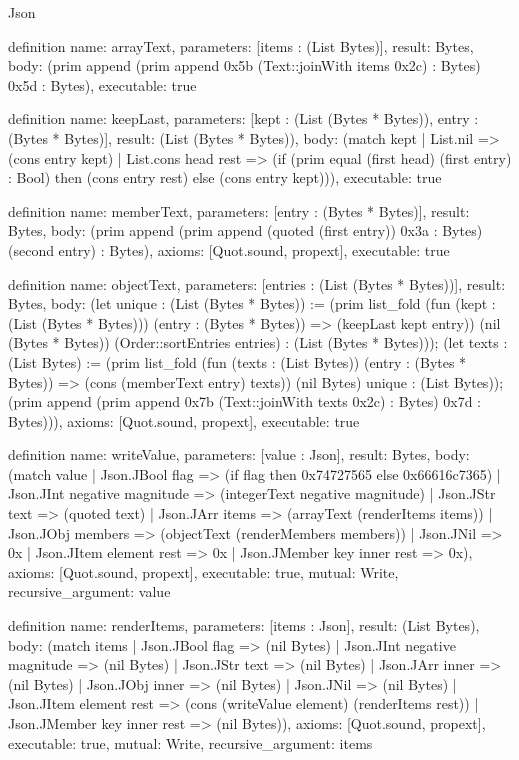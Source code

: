 \begin{lexlean}{Json}
\begin{semanticmodule}
definition{
  name: arrayText,
  parameters: [items : (List Bytes)],
  result: Bytes,
  body: (prim append (prim append 0x5b (Text::joinWith items 0x2c) : Bytes) 0x5d : Bytes),
  executable: true
}

definition{
  name: keepLast,
  parameters: [kept : (List (Bytes * Bytes)), entry : (Bytes * Bytes)],
  result: (List (Bytes * Bytes)),
  body: (match kept
    | List.nil => (cons entry kept)
    | List.cons head rest => (if (prim equal (first head) (first entry) : Bool) then (cons entry rest) else (cons entry kept))),
  executable: true
}

definition{
  name: memberText,
  parameters: [entry : (Bytes * Bytes)],
  result: Bytes,
  body: (prim append (prim append (quoted (first entry)) 0x3a : Bytes) (second entry) : Bytes),
  axioms: [Quot.sound, propext],
  executable: true
}

definition{
  name: objectText,
  parameters: [entries : (List (Bytes * Bytes))],
  result: Bytes,
  body: (let unique : (List (Bytes * Bytes)) := (prim list_fold (fun (kept : (List (Bytes * Bytes))) (entry : (Bytes * Bytes)) => (keepLast kept entry)) (nil (Bytes * Bytes)) (Order::sortEntries entries) : (List (Bytes * Bytes))); (let texts : (List Bytes) := (prim list_fold (fun (texts : (List Bytes)) (entry : (Bytes * Bytes)) => (cons (memberText entry) texts)) (nil Bytes) unique : (List Bytes)); (prim append (prim append 0x7b (Text::joinWith texts 0x2c) : Bytes) 0x7d : Bytes))),
  axioms: [Quot.sound, propext],
  executable: true
}

definition{
  name: writeValue,
  parameters: [value : Json],
  result: Bytes,
  body: (match value
    | Json.JBool flag => (if flag then 0x74727565 else 0x66616c7365)
    | Json.JInt negative magnitude => (integerText negative magnitude)
    | Json.JStr text => (quoted text)
    | Json.JArr items => (arrayText (renderItems items))
    | Json.JObj members => (objectText (renderMembers members))
    | Json.JNil => 0x
    | Json.JItem element rest => 0x
    | Json.JMember key inner rest => 0x),
  axioms: [Quot.sound, propext],
  executable: true,
  mutual: Write,
  recursive_argument: value
}

definition{
  name: renderItems,
  parameters: [items : Json],
  result: (List Bytes),
  body: (match items
    | Json.JBool flag => (nil Bytes)
    | Json.JInt negative magnitude => (nil Bytes)
    | Json.JStr text => (nil Bytes)
    | Json.JArr inner => (nil Bytes)
    | Json.JObj inner => (nil Bytes)
    | Json.JNil => (nil Bytes)
    | Json.JItem element rest => (cons (writeValue element) (renderItems rest))
    | Json.JMember key inner rest => (nil Bytes)),
  axioms: [Quot.sound, propext],
  executable: true,
  mutual: Write,
  recursive_argument: items
}


\end{semanticmodule}
\end{lexlean}
